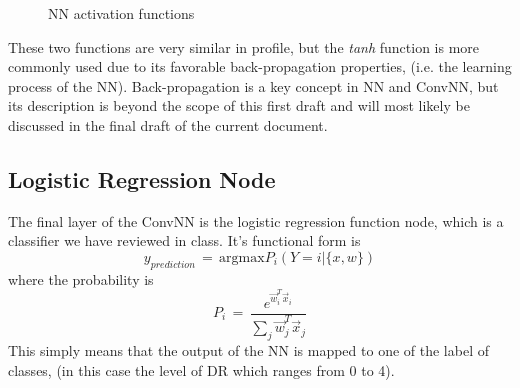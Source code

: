 \documentclass[letterpaper,12pt]{article}
\begin{document}
\begin{figure}[htbp]
\begin{center}
\caption{NN activation functions}
\label{marking_image}
\end{center}
\end{figure}

These two functions are very similar in profile, but the \textit{tanh} function is more commonly used due to its favorable back-propagation properties, (i.e. the learning process of the NN). Back-propagation is a key concept in NN and ConvNN, but its description is beyond the scope of this first draft and will most likely be discussed in the final draft of the current document.

\subsection{Logistic Regression Node}

The final layer of the ConvNN is the logistic regression function node, which is a classifier we have reviewed in class. It's functional form is \cite{deep}
\begin{equation}
y_{prediction} \, = \, \text{argmax} P_i (Y = i | \{x, w\})
\end{equation}
where the probability is
\begin{equation}
P_i \, = \, \frac{e^{\vec{w}_i^T \vec{x}_i}}{\sum_j \vec{w}_j^T \vec{x}_j }
\end{equation}
This simply means that the output of the NN is mapped to one of the label of classes, (in this case the level of DR which ranges from 0 to 4).
\end{document}
